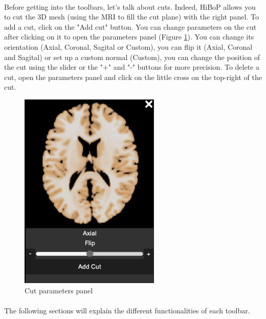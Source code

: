 \documentclass[a4paper]{article}
\begin{document}
\paragraph{} Before getting into the toolbars, let's talk about cuts. Indeed, HiBoP allows you to cut the 3D mesh (using the MRI to fill the cut plane) with the right panel. To add a cut, click on the "Add cut" button. You can change parameters on the cut after clicking on it to open the parameters panel (Figure \ref{cut}). You can change its orientation (Axial, Coronal, Sagital or Custom), you can flip it (Axial, Coronal and Sagital) or set up a custom normal (Custom), you can change the position of the cut using the slider or the "+" and "-" buttons for more precision. To delete a cut, open the parameters panel and click on the little cross on the top-right of the cut.
\begin{figure}[H]
\begin{center}
\includegraphics[scale=0.5]{Cut.png}
\end{center}
\caption{\label{cut}Cut parameters panel}
\end{figure}
\paragraph{} The following sections will explain the different functionalities of each toolbar.
\end{document}
